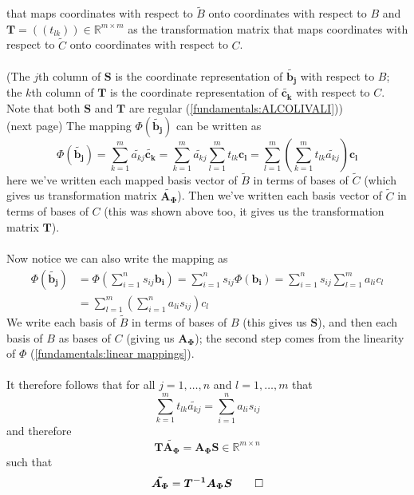 \documentclass{report}
\begin{document}
that maps coordinates with respect to $\tilde{B}$ onto coordinates with respect to
$B$ and $\bm{T}=((t_{lk}))\in\mathbb{R}^{m\times m}$ as the transformation matrix that
maps coordinates with respect to $\tilde{C}$ onto coordinates with respect to $C$.\\
\vspace{1mm}\\
(The $j$th column of $\bm{S}$ is the coordinate representation of $\tilde{\bm{b_j}}$ with respect to $B$;
the $k$th column of $\bm{T}$ is the coordinate representation of $\tilde{\bm{c_k}}$ with respect to $C$.
Note that both $\bm{S}$ and $\bm{T}$ are regular (\ref{fundamentals:ALCOLIVALI}))\\
(next page)
\newpage
\noindent The mapping $\Phi(\tilde{\bm{b_j}})$ can be written as
\begin{equation*}
\Phi(\tilde{\bm{b_j}})=\sum^{m}_{k=1}\tilde{a_{kj}}\tilde{\bm{c_k}}
=\sum^{m}_{k=1}\tilde{a_{kj}}\sum^m_{l=1}t_{lk}\bm{c_l}
=\sum^m_{l=1}\left(\sum^{m}_{k=1}t_{lk}\tilde{a_{kj}}\right)\bm{c_l}
\end{equation*}
here we've written each mapped basis vector of $\tilde{B}$ in terms of bases of $\tilde{C}$ 
(which gives us transformation matrix $\bm{\tilde{A_\Phi}}$). 
Then we've written each basis vector of $\tilde{C}$ in terms of bases of $C$ 
(this was shown above too, it gives us the transformation matrix $\bm{T}$).\\
\vspace{1mm}\\
Now notice we can also write the mapping as
\begin{align*}
\Phi(\tilde{\bm{b_j}})&=\Phi\left(\sum^n_{i=1}s_{ij}\bm{b_i}\right)
=\sum^n_{i=1}s_{ij}\Phi(\bm{b_i})
=\sum^n_{i=1}s_{ij}\sum^{m}_{l=1}a_{li}c_l\\
&=\sum^{m}_{l=1}\left(\sum^n_{i=1}a_{li}s_{ij}\right)c_l
\end{align*}
We write each basis of $\tilde{B}$ in terms of bases of $B$ (this gives us $\bm{S}$), 
and then each basis of $B$ as bases of $C$ (giving us $\bm{A_\Phi}$); the second step comes from the 
linearity of $\Phi$ (\ref{fundamentals:linear mappings}).
\\
\vspace{1mm}\\
It therefore follows that for all $j=1,\ldots,n$ and $l=1,\ldots,m$ that
\begin{equation*}
\sum^{m}_{k=1}t_{lk}\tilde{a_{kj}}=\sum^n_{i=1}a_{li}s_{ij}
\end{equation*}
and therefore
\begin{equation*}
\bm{T\tilde{A_\Phi}}=\bm{A_\Phi S}\in\mathbb{R}^{m\times n}
\end{equation*}
such that
\begin{equation*}
\bm{\tilde{A_\Phi}}=\bm{T^{-1}A_\Phi S}\qed
\end{equation*}
\newpage
\end{document}
